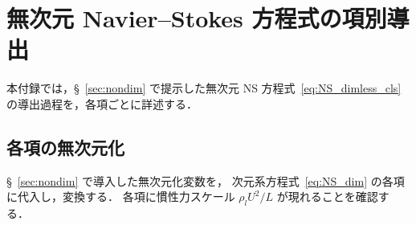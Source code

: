 %

\section{無次元 Navier--Stokes 方程式の項別導出}
\label{app:nondim_details}

本付録では，§~\ref{sec:nondim} で提示した無次元 NS 方程式~\eqref{eq:NS_dimless_cls}
の導出過程を，各項ごとに詳述する．

\subsection{各項の無次元化}
\label{sec:nondim_items}

§~\ref{sec:nondim} で導入した無次元化変数を，
次元系方程式~\eqref{eq:NS_dim} の各項に代入し，変換する．
各項に慣性力スケール $\rho_l U^2 / L$ が現れることを確認する．

